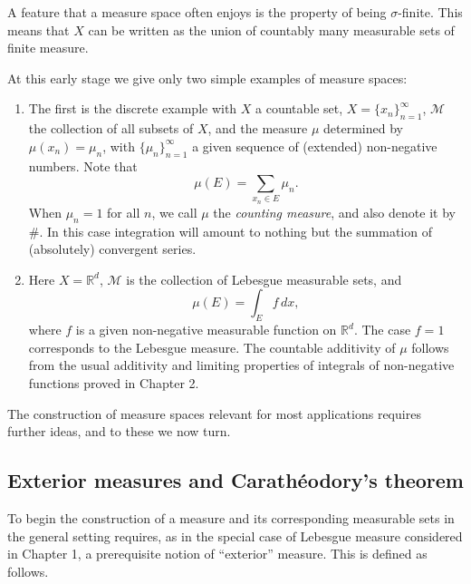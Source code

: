 \documentclass[11pt,openany]{book}
\begin{document}
A feature that a measure space often enjoys is the property of being $\sigma$-finite. This means that $X$ can be written as the union of countably many measurable sets of finite measure.

At this early stage we give only two simple examples of measure spaces:
\begin{enumerate}
\item[(i)] The first is the discrete example with $X$ a countable set, $X=\{x_n\}_{n=1}^{\infty}$, $\mathcal M$ the collection of all subsets of $X$, and the measure $\mu$ determined by $\mu(x_n)=\mu_n$, with $\{\mu_n\}_{n=1}^{\infty}$ a given sequence of (extended) non-negative numbers. Note that
\[
\mu(E)=\sum_{x_n\in E}\mu_n.
\]
When $\mu_n=1$ for all $n$, we call $\mu$ the \emph{counting measure}, and also denote it by $\#$. In this case integration will amount to nothing but the summation of (absolutely) convergent series.
\item[(ii)] Here $X=\mathbb R^d$, $\mathcal M$ is the collection of Lebesgue measurable sets, and
\[
\mu(E)=\int_E f\,dx,
\]
where $f$ is a given non-negative measurable function on $\mathbb R^d$. The case $f=1$ corresponds to the Lebesgue measure. The countable additivity of $\mu$ follows from the usual additivity and limiting properties of integrals of non-negative functions proved in Chapter 2.
\end{enumerate}

The construction of measure spaces relevant for most applications requires further ideas, and to these we now turn.

\subsection{Exterior measures and Carath\'eodory's theorem}

To begin the construction of a measure and its corresponding measurable sets in the general setting requires, as in the special case of Lebesgue measure considered in Chapter 1, a prerequisite notion of ``exterior'' measure. This is defined as follows.
\end{document}
